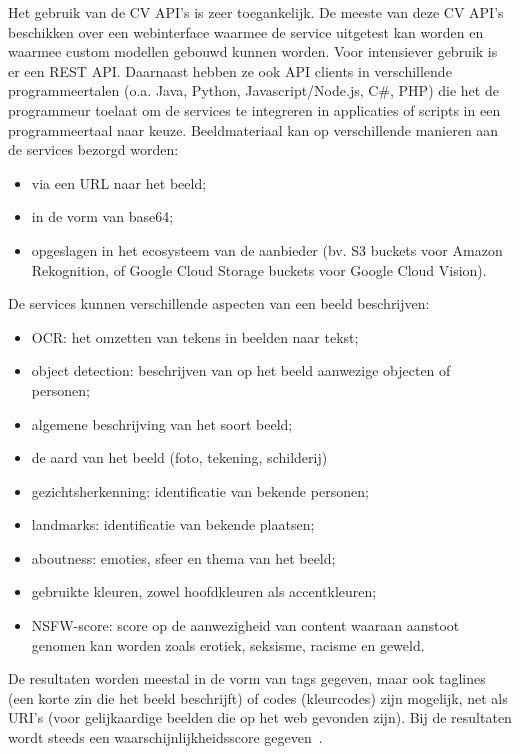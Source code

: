 Het gebruik van de CV API’s is zeer toegankelijk. De meeste van deze CV API’s beschikken over een webinterface waarmee de service uitgetest kan worden en waarmee custom modellen gebouwd kunnen worden. Voor intensiever gebruik is er een REST API. Daarnaast hebben ze ook API clients in verschillende programmeertalen (o.a. Java, Python, Javascript/Node.js, C\#, PHP) die het de programmeur toelaat om de services te integreren in applicaties of scripts in een programmeertaal naar keuze. Beeldmateriaal kan op verschillende manieren aan de services bezorgd worden:
\begin{itemize}
	\item via een URL naar het beeld;
	\item in de vorm van base64;
	\item opgeslagen in het ecosysteem van de aanbieder (bv. S3 buckets voor Amazon Rekognition, of Google Cloud Storage buckets voor Google Cloud Vision).
\end{itemize}

De services kunnen verschillende aspecten van een beeld beschrijven:
\begin{itemize}
	\item OCR: het omzetten van tekens in beelden naar tekst;
	\item object detection: beschrijven van op het beeld aanwezige objecten of personen;
	\item algemene beschrijving van het soort beeld;
	\item de aard van het beeld (foto, tekening, schilderij)
	\item gezichtsherkenning: identificatie van bekende personen;
	\item landmarks: identificatie van bekende plaatsen;
	\item aboutness: emoties, sfeer en thema van het beeld;
	\item gebruikte kleuren, zowel hoofdkleuren als accentkleuren;
	\item NSFW-score: score op de aanwezigheid van content waaraan aanstoot genomen kan worden zoals erotiek, seksisme, racisme en geweld.
\end{itemize}

De resultaten worden meestal in de vorm van tags gegeven, maar ook taglines (een korte zin die het beeld beschrijft) of codes (kleurcodes) zijn mogelijk, net als URI’s (voor gelijkaardige beelden die op het web gevonden zijn). Bij de resultaten wordt steeds een waarschijnlijkheidsscore gegeven~\autocite{Vanstappen2019}.

